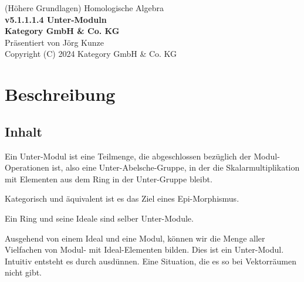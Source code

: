\documentclass[a4paper]{amsart}
\theoremstyle{definition}
\begin{document}
\begin{titlepage}
\centering
{\huge
(Höhere Grundlagen) Homologische Algebra\\[1cm]
\textbf{v5.1.1.1.4 Unter-Moduln}
}\\[1cm]

\textbf{Kategory GmbH \& Co. KG}\\
Präsentiert von Jörg Kunze\\
Copyright (C) 2024 Kategory GmbH \& Co. KG

\end{titlepage}

%

\newpage

\section*{Beschreibung}

\subsection*{Inhalt}
Ein Unter-Modul ist eine Teilmenge, die abgeschlossen bezüglich der Modul-Operationen ist, also eine Unter-Abelsche-Gruppe, in der die Skalarmultiplikation mit Elementen aus dem Ring in der Unter-Gruppe bleibt.

Kategorisch und äquivalent ist es das Ziel eines Epi-Morphismus.

Ein Ring und seine Ideale sind selber Unter-Module.

Ausgehend von einem Ideal und eine Modul, können wir die Menge aller Vielfachen von Modul- mit Ideal-Elementen bilden. Dies ist ein Unter-Modul. Intuitiv entsteht es durch ausdünnen. Eine Situation, die es so bei Vektorräumen nicht gibt.
\end{document}
